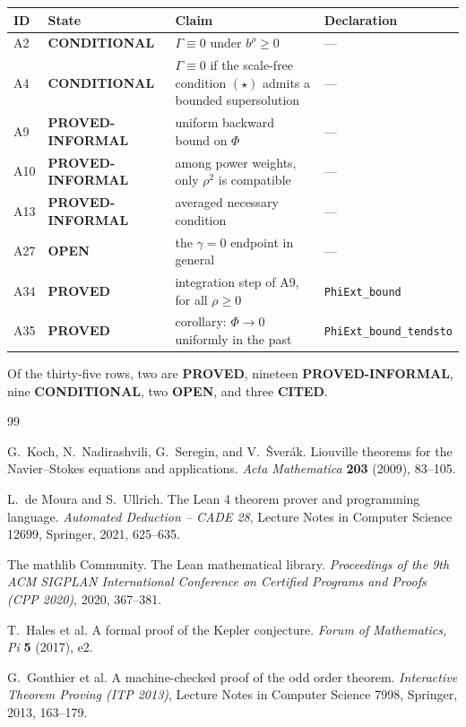 \documentclass[11pt]{article}
\newcommand{\claim}[1]{\textbf{#1}}
\newcommand{\code}[1]{\texttt{#1}}
\begin{document}
\begin{center}
\begin{tabular}{@{}p{}p{}p{}p{}@{}}
\toprule
ID & State & Claim & Declaration \\
\midrule
A2 & \claim{CONDITIONAL} & $\Gamma \equiv 0$ under $b^\rho \ge 0$ & --- \\
A4 & \claim{CONDITIONAL} & $\Gamma \equiv 0$ if the scale-free condition
  $(\star)$ admits a bounded supersolution & --- \\
A9 & \claim{PROVED-INFORMAL} & uniform backward bound on $\Phi$ & --- \\
A10 & \claim{PROVED-INFORMAL} & among power weights, only $\rho^2$ is
  compatible & --- \\
A13 & \claim{PROVED-INFORMAL} & averaged necessary condition & --- \\
A27 & \claim{OPEN} & the $\gamma=0$ endpoint in general & --- \\
A34 & \claim{PROVED} & integration step of A9, for all $\rho \ge 0$ &
  \code{PhiExt\_bound} \\
A35 & \claim{PROVED} & corollary: $\Phi \to 0$ uniformly in the past &
  \code{PhiExt\_bound\_tendsto} \\
\bottomrule
\end{tabular}
\end{center}

Of the thirty-five rows, two are \claim{PROVED}, nineteen
\claim{PROVED-INFORMAL}, nine \claim{CONDITIONAL}, two \claim{OPEN}, and three
\claim{CITED}.

\begin{thebibliography}{99}

G.~Koch, N.~Nadirashvili, G.~Seregin, and V.~\v{S}ver\'ak.
\newblock Liouville theorems for the Navier--Stokes equations and applications.
\newblock \emph{Acta Mathematica} \textbf{203} (2009), 83--105.

L.~de Moura and S.~Ullrich.
\newblock The Lean 4 theorem prover and programming language.
\newblock \emph{Automated Deduction -- CADE 28}, Lecture Notes in Computer
  Science 12699, Springer, 2021, 625--635.

The mathlib Community.
\newblock The Lean mathematical library.
\newblock \emph{Proceedings of the 9th ACM SIGPLAN International Conference on
  Certified Programs and Proofs (CPP 2020)}, 2020, 367--381.

T.~Hales et al.
\newblock A formal proof of the Kepler conjecture.
\newblock \emph{Forum of Mathematics, Pi} \textbf{5} (2017), e2.

G.~Gonthier et al.
\newblock A machine-checked proof of the odd order theorem.
\newblock \emph{Interactive Theorem Proving (ITP 2013)}, Lecture Notes in
  Computer Science 7998, Springer, 2013, 163--179.

\end{thebibliography}
\end{document}
